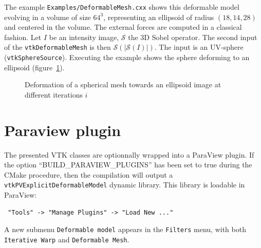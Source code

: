 \documentclass{InsightArticle}
\begin{document}
The example \verb!Examples/DeformableMesh.cxx! shows this deformable model 
evolving in a volume of size $64^3$, representing an ellipsoid of radius 
$(18,14,28)$ and centered in the volume. The external forces are computed in a 
classical fashion. Let $I$ be an intensity image, $\mathcal{S}$ the 3D Sobel
operator. The second input of the \verb!vtkDeformableMesh! is then 
$\mathcal{S}(|\mathcal{S}(I)|)$. The
input is an UV-sphere (\verb!vtkSphereSource!). Executing the example shows the
sphere deforming to an ellipsoid (figure~\ref{fig:deform-sphere}).
%
\begin{figure}
\centering
\caption{Deformation of a spherical mesh towards an ellipsoid image at different
iterations $i$}
\label{fig:deform-sphere}
\end{figure}
%
\section{Paraview plugin}
%
The presented VTK classes are optionnally wrapped into a ParaView plugin. If 
the option ``BUILD\_PARAVIEW\_PLUGINS'' has been set to true during the CMake 
procedure, then the compilation will output a \verb!vtkPVExplicitDeformableModel!
dynamic library. This library is loadable in ParaView:
%
\begin{verbatim}
 "Tools" -> "Manage Plugins" -> "Load New ..."
\end{verbatim}
%
A new submenu \verb!Deformable model! appears in the \verb!Filters! menu, with
both \verb!Iterative Warp! and \verb!Deformable Mesh!.
%
\end{document}
